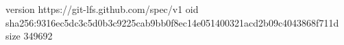 version https://git-lfs.github.com/spec/v1
oid sha256:9316ec5dc3c5d0b3c9225cab9bb0f8ec14e051400321acd2b09c4043868f711d
size 349692
